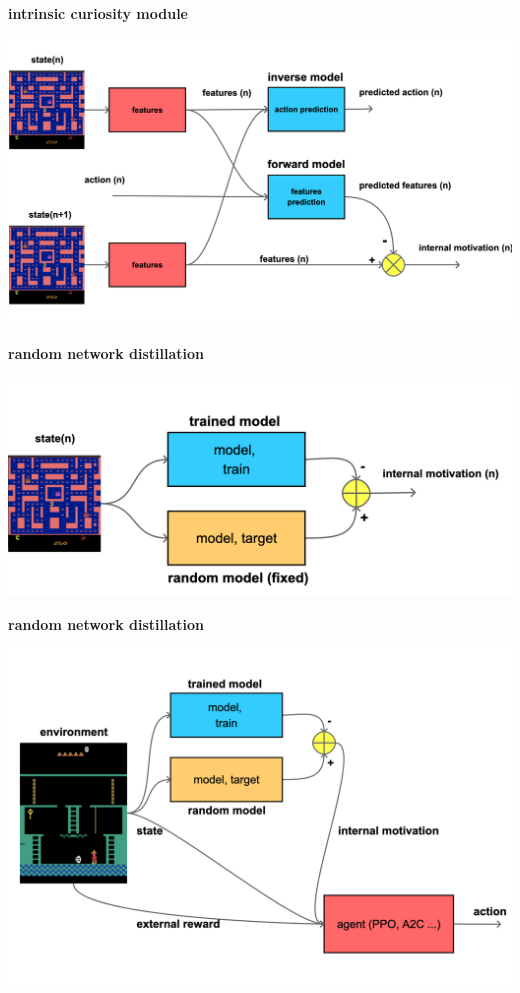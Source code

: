 \documentclass[xcolor=dvipsnames]{beamer}
\begin{document}
\begin{frame}{\bf intrinsic curiosity module}

\centering
\includegraphics[scale=0.15]{../diagrams/internal_motivation/icm.png}

\end{frame}

\begin{frame}{\bf random network distillation}

\centering
\includegraphics[scale=0.15]{../diagrams/internal_motivation/rnd.png}

\end{frame}


\begin{frame}{\bf random network distillation}

\centering
\includegraphics[scale=0.15]{../diagrams/rnd/rnd.png}

\end{frame}
\end{document}
